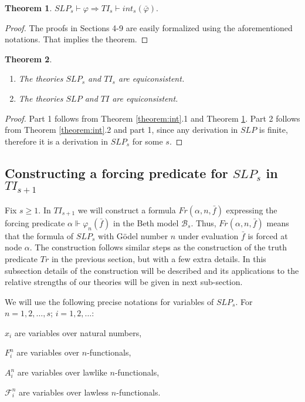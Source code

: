 \documentclass{asl}
\newtheorem{theorem}{Theorem}[section]
\theoremstyle{definition}
\begin{document}
\begin{theorem}
$SLP_s\vdash \varphi \Rightarrow TI_s\vdash int_s(\bar{\varphi}).$
\label{theorem:ints}
\end{theorem}

\begin{proof}
The proofs in Sections 4-9 are easily formalized using the aforementioned notations. That implies the theorem.
\end{proof}

\begin{theorem}
\begin{enumerate}
\item The theories $SLP_s$ and $TI_s$ are equiconsistent.
\item The theories $SLP$ and $TI$ are equiconsistent.
\end{enumerate}
\label{theorem:con}
\end{theorem}

\begin{proof}
Part 1 follows from Theorem \ref{theorem:int}.1 and Theorem \ref{theorem:ints}. Part 2 follows from Theorem \ref{theorem:int}.2 and  part 1, since any derivation in $SLP$ is finite, therefore it is a derivation in $SLP_s$ for some $s$.
\end{proof}

\subsection{Constructing a forcing predicate for $SLP_s$ in $TI_{s+1}$}

Fix $s\geqslant 1$. In $TI_{s+1}$ we will construct a formula $Fr(\alpha,n,\bar{f})$ expressing the forcing predicate $\alpha\Vdash\varphi_n(\bar{f})$ in the Beth model $\mathcal{B}_s$. Thus, $Fr(\alpha,n,\bar{f})$ means that the formula of $SLP_s$ with G\"{o}del number $n$ under evaluation $\bar{f}$ is forced at node $\alpha$. The construction follows similar steps as the construction of the truth predicate $Tr$ in the previous section, but with a few extra details. In this subsection details of the construction will be described and its applications to the relative strengths of our theories will be given in next sub-section.

We will use the following precise notations for variables of $SLP_s$. For $n=1,2,\ldots,s$; $i=1,2, \ldots$:
\begin{list}{â¢}{â¢}
\item $x_i$ are variables over natural numbers,
\smallskip
\item $F_i^n$ are variables over $n$-functionals,
\smallskip
\item $A_i^n$ are variables over lawlike $n$-functionals,
\smallskip
\item $\mathcal{F}_i^n$ are variables over lawless $n$-functionals.
\end{list}
\end{document}
